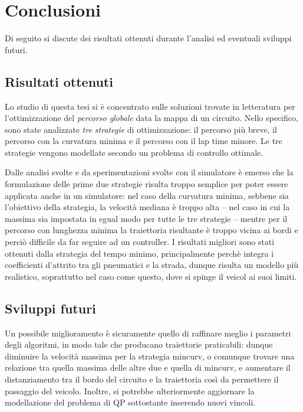 \chapter{Conclusioni}

Di seguito si discute dei risultati ottenuti durante l'analisi ed eventuali sviluppi futuri.

\section{Risultati ottenuti}
Lo studio di questa tesi si è concentrato sulle soluzioni trovate in letteratura per l'ottimizzazione del
\textit{percorso globale} data la mappa di un circuito. Nello specifico, sono state analizzate \textit{tre strategie} di
ottimizzazione: il percorso più breve, il percorso con la curvatura minima e il percorso con il lap time
minore. Le tre strategie vengono modellate secondo un problema di controllo ottimale.

Dalle analisi svolte e da sperimentazioni svolte con il simulatore è emerso che la formulazione delle
prime due strategie risulta troppo semplice per poter essere applicata anche in un simulatore: nel caso
della curvatura minima, sebbene sia l'obiettivo della strategia, la velocità mediana è troppo alta -- nel
caso in cui la massima sia impostata in egual modo per tutte le tre strategie -- mentre per il percorso
con lunghezza minima la traiettoria risultante è troppo vicina ai bordi e perciò difficile da far
seguire ad un controller. I risultati migliori sono stati ottenuti dalla strategia del tempo minimo,
principalmente perchè integra i coefficienti d'attrito tra gli pneumatici e la strada, dunque risulta un
modello più realistico, soprattutto nel caso come questo, dove si spinge il veicol ai suoi limiti.


\section{Sviluppi futuri}
Un possibile miglioramento è sicuramente quello di raffinare meglio i parametri degli algoritmi, in modo
tale che producano traiettorie praticabili: dunque diminuire la velocità massima per la strategia
mincurv, o comunque trovare una relazione tra quella massima delle altre due e quella di mincurv, e
aumentare il distanziamento tra il bordo del circuito e la traiettoria così da permettere il passaggio
del veicolo. Inoltre, si potrebbe ulteriormente aggiornare la modellazione del problema di QP sottostante
inserendo nuovi vincoli.

